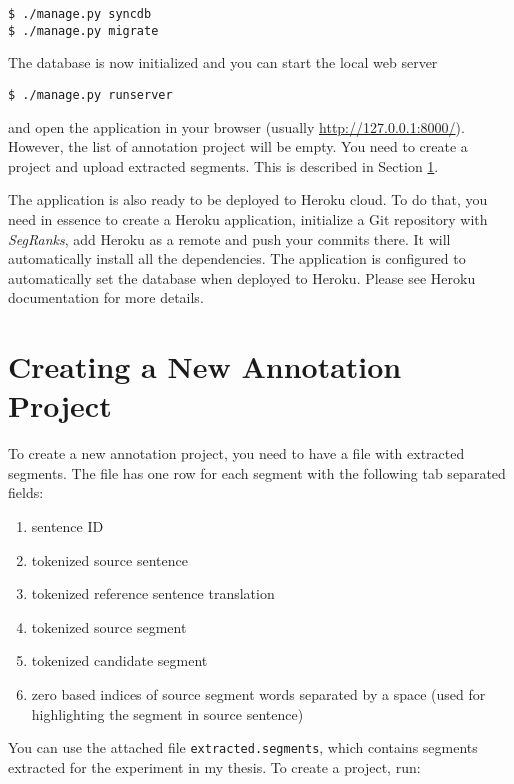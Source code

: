 \begin{verbatim}
$ ./manage.py syncdb 
$ ./manage.py migrate 
\end{verbatim}

\noindent
The database is now initialized and you can start the local web server

\begin{verbatim}
$ ./manage.py runserver
\end{verbatim}

\noindent
and open the application in your browser (usually \url{http://127.0.0.1:8000/}).
However, the list of annotation project will be empty. You need to create
a project and upload extracted segments. This is described in Section \ref{creating-project}.

The application is also ready to be deployed to Heroku cloud. To do that, you
need in essence to create a Heroku application, initialize a Git repository
with \textit{SegRanks}, add Heroku as a remote and push your commits there.
It will automatically install all the dependencies. The application is
configured to automatically set the database when deployed to Heroku. Please
see Heroku documentation for more details.

\section{Creating a New Annotation Project}
\label{creating-project}

To create a new annotation project, you need to have a file with extracted
segments.  The file has one row for each segment with the following tab
separated fields:

\begin{enumerate}
  \item sentence ID
  \item tokenized source sentence
  \item tokenized reference sentence translation
  \item tokenized source segment
  \item tokenized candidate segment 
  \item zero based indices of source segment words separated by a space (used for highlighting the segment in source sentence)
\end{enumerate}

\noindent
You can use the attached file \texttt{extracted.segments}, which contains
segments extracted for the experiment in my thesis. To create a project, run:

